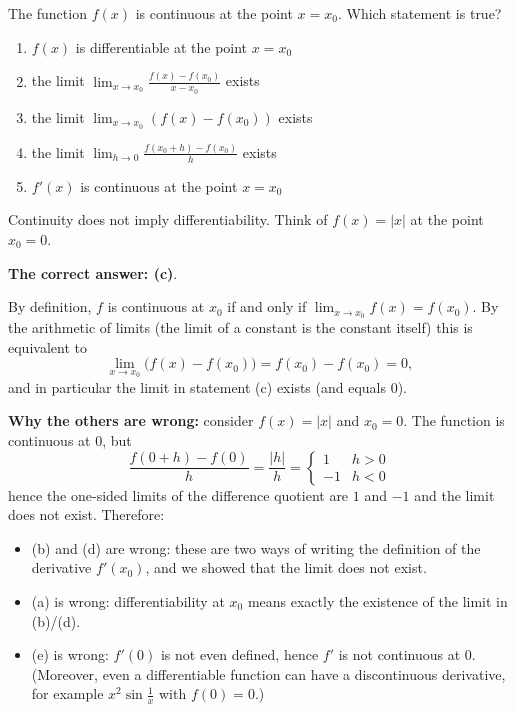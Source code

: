 
\begin{question}
The function $f(x)$ is continuous at the point $x=x_0$. Which statement is true?
\begin{enumerate}
  \item $f(x)$ is differentiable at the point $x=x_0$
  \item the limit $\displaystyle\lim_{x\to x_0}\frac{f(x)-f(x_0)}{x-x_0}$ exists
  \item the limit $\displaystyle\lim_{x\to x_0}\left(f(x)-f(x_0)\right)$ exists
  \item the limit $\displaystyle\lim_{h\to 0}\frac{f(x_0+h)-f(x_0)}{h}$ exists
  \item $f'(x)$ is continuous at the point $x=x_0$
\end{enumerate}
\end{question}

\begin{hint}
Continuity does not imply differentiability. Think of $f(x)=|x|$ at the point $x_0=0$.
\end{hint}

\begin{solution}
\textbf{The correct answer: (c)}.

By definition, $f$ is continuous at $x_0$ if and only if $\lim_{x\to x_0}f(x)=f(x_0)$. By the arithmetic of limits (the limit of a constant is the constant itself) this is equivalent to
\[
\lim_{x\to x_0}\bigl(f(x)-f(x_0)\bigr)=f(x_0)-f(x_0)=0 ,
\]
and in particular the limit in statement (c) exists (and equals 0).

\textbf{Why the others are wrong:} consider $f(x)=|x|$ and $x_0=0$. The function is continuous at 0, but
\[
\frac{f(0+h)-f(0)}{h}=\frac{|h|}{h}=\begin{cases}1 & h>0\\ -1 & h<0\end{cases}
\]
hence the one-sided limits of the difference quotient are $1$ and $-1$ and the limit does not exist. Therefore:
\begin{itemize}
  \item (b) and (d) are wrong: these are two ways of writing the definition of the derivative $f'(x_0)$, and we showed that the limit does not exist.
  \item (a) is wrong: differentiability at $x_0$ means exactly the existence of the limit in (b)/(d).
  \item (e) is wrong: $f'(0)$ is not even defined, hence $f'$ is not continuous at 0. (Moreover, even a differentiable function can have a discontinuous derivative, for example $x^2\sin\frac1x$ with $f(0)=0$.)
\end{itemize}
\end{solution}
